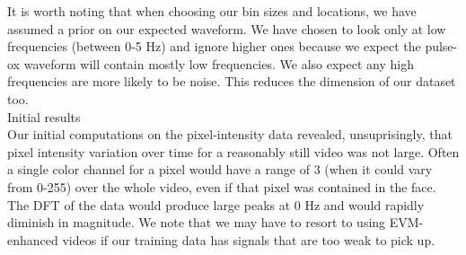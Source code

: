 \documentclass[12pt]{article}
\begin{document}
It is worth noting that when choosing our bin sizes and locations, we have assumed a prior on our expected waveform. 
We have chosen to look only at low frequencies (between 0-5 Hz) and 
ignore higher ones because we expect the pulse-ox waveform will contain  mostly low frequencies.
We also expect any high frequencies are more likely to be noise.
This reduces the dimension of our dataset too.\\

\large Initial results \\
\small Our initial computations on the pixel-intensity data revealed, unsuprisingly,
that pixel intensity variation over time for a reasonably still video was not large.
Often a single color channel for a pixel would have a range of 3 (when it could vary from 0-255) over the whole video, even if that pixel was contained in the face.
The DFT of the data would produce large peaks at 0 Hz and would rapidly diminish in magnitude.
We note that we may have to resort to using EVM-enhanced videos if our training data has signals that are too weak to pick up.


\end{document}
